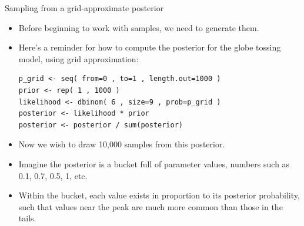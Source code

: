 \documentclass[handout]{beamer}
\begin{document}
\begin{frame}[fragile]{Sampling from a grid-approximate posterior}
\scriptsize{
\begin{itemize}

\item Before beginning to work with samples, we need to generate them.

\item Here’s a reminder for how to compute the posterior for the globe tossing model, using grid approximation:

\begin{verbatim}
p_grid <- seq( from=0 , to=1 , length.out=1000 )
prior <- rep( 1 , 1000 )
likelihood <- dbinom( 6 , size=9 , prob=p_grid )
posterior <- likelihood * prior
posterior <- posterior / sum(posterior)

\end{verbatim}

\item Now we wish to draw 10,000 samples from this posterior. 

\item Imagine the posterior is a bucket full of parameter values, numbers such as 0.1, 0.7, 0.5, 1, etc.

\item Within the bucket, each value exists in proportion to its posterior probability, such that values near the peak are much more common than those in the tails. 
 
\end{itemize}



} 

\end{frame}
\end{document}
